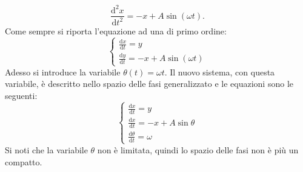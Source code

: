 \begin{exmp}
    \[
	\frac{\text{d} ^2x}{\text{d} t^2} = -x + A\sin (\omega t)
    .\] 
    Come sempre si riporta l'equazione ad una di primo ordine:
    \[
        \begin{cases}
            \frac{\text{d} x}{\text{d} t} = y \\
	    \frac{\text{d} y}{\text{d} t} = -x + A \sin (\omega t)
        \end{cases}
    \] 
    Adesso si introduce la variabile $\theta (t)=\omega t$. Il nuovo sistema, con questa variabile, è descritto nello spazio delle fasi generalizzato e le equazioni sono le seguenti:
    \[
        \begin{cases}
            \frac{\text{d} x}{\text{d} t} = y\\
	    \frac{\text{d} x}{\text{d} t} = -x + A\sin\theta\\
	    \frac{\text{d} \theta}{\text{d} t} =\omega
        \end{cases}
    \] 
    Si noti che la variabile $\theta$ non è limitata, quindi lo spazio delle fasi non è più un compatto.
\end{exmp}
\noindent
